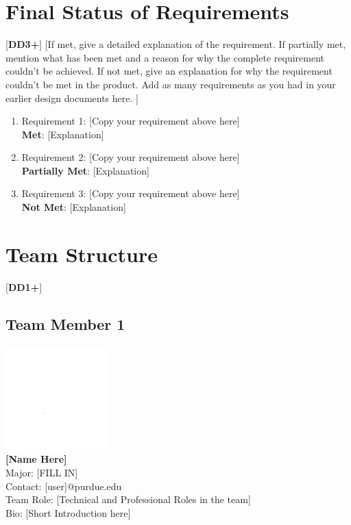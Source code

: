 \documentclass[letterpaper, 11pt]{article}
\begin{document}
\clearpage
\section{Final Status of Requirements}
 [\textbf{DD3+}]
 [If met, give a detailed explanation of the requirement. If partially met, mention what has been met and a reason for why the complete requirement couldn’t be achieved. If not met, give an explanation for why the requirement couldn’t be met in the product. Add as many requirements as you had in your earlier design documents here. ]
\begin{enumerate}
    \item Requirement 1: [Copy your requirement above here] \\
          \textbf{Met}: [Explanation]
    \item Requirement 2: [Copy your requirement above here] \\
          \textbf{Partially Met}: [Explanation]
    \item Requirement 3: [Copy your requirement above here] \\
          \textbf{Not Met}: [Explanation]
\end{enumerate}

\clearpage
\section{Team Structure}
 [\textbf{DD1+}]
\subsection{Team Member 1}
\includegraphics[height=4cm]{images/white.png} \\
\textbf{[Name Here]}\\
Major: [FILL IN]\\
Contact: [user]@purdue.edu\\
Team Role: [Technical and Professional Roles in the team] \\
Bio: [Short Introduction here]
\end{document}
